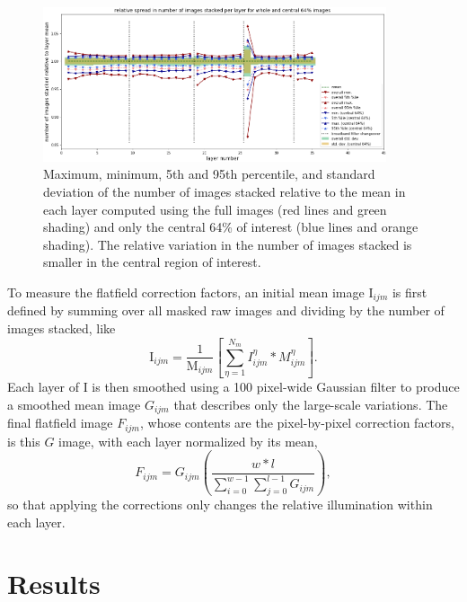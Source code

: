 \documentclass[letterpaper,11pt]{article}
\newcommand{\Iota}{\mathrm{I}}
\newcommand{\Mu}{\mathrm{M}}
\begin{document}
\begin{figure}[!ht]
\centering
\includegraphics[width=0.90\textwidth]{images/measuring_flatfield_corrections/mask_stack_variation_reduction}
\caption{\footnotesize Maximum, minimum, 5th and 95th percentile, and standard deviation of the number of images stacked relative to the mean in each layer computed using the full images (red lines and green shading) and only the central 64\% of interest (blue lines and orange shading). The relative variation in the number of images stacked is smaller in the central region of interest.}
\label{fig:removing_image_edges_effect_on_mask_stacks}
\end{figure} 

To measure the flatfield correction factors, an initial mean image $\Iota_{ijm}$ is first defined by summing over all masked raw images and dividing by the number of images stacked, like
\begin{equation}
\Iota_{ijm} = \frac{1}{\Mu_{ijm}} \left[ \sum_{\eta=1}^{N_{m}} I^{\eta}_{ijm}*M^{\eta}_{ijm} \right] .
\end{equation}
Each layer of $\Iota$ is then smoothed using a 100 pixel-wide Gaussian filter to produce a smoothed mean image $G_{ijm}$ that describes only the large-scale variations. The final flatfield image $F_{ijm}$, whose contents are the pixel-by-pixel correction factors, is this $G$ image, with each layer normalized by its mean,
\begin{equation}
F_{ijm} = G_{ijm} \left( \frac{w*l}{\sum_{i=0}^{w-1}\sum_{j=0}^{l-1}G_{ijm}} \right) ,
\end{equation}
so that applying the corrections only changes the relative illumination within each layer. 

\section{Results}
\label{sec:results}
\end{document}
